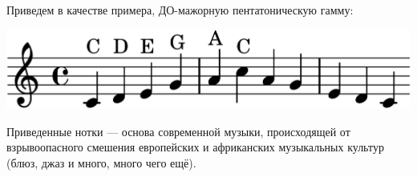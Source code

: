 Приведем в качестве примера, ДО-мажорную пентатоническую гамму:
\begin{center}    
    \includegraphics{fig/notes/scale-penta-c-maj}
\end{center}    

Приведенные нотки --- основа современной музыки, происходящей от взрывоопасного смешения европейских и африканских музыкальных культур (блюз, джаз и много, много чего ещё).